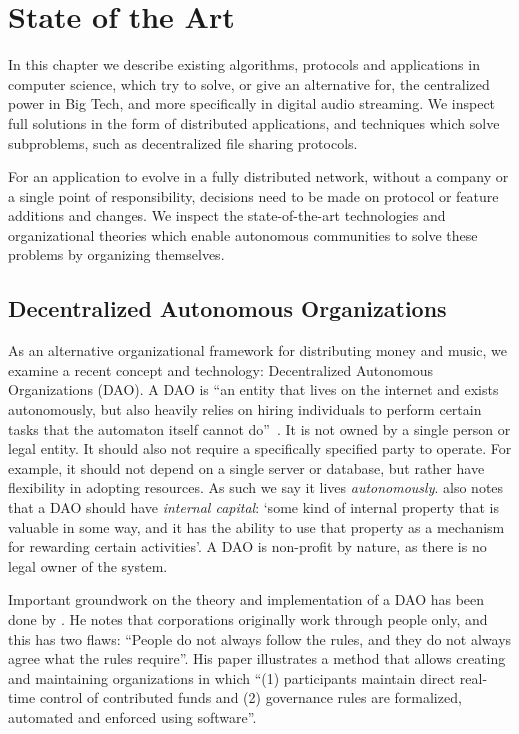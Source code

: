\chapter{\label{chap:state-of-the-art}State of the Art}
In this chapter we describe existing algorithms, protocols and applications in computer science, which try to solve, or give an alternative for, the centralized power in Big Tech, and more specifically in digital audio streaming. We inspect full solutions in the form of distributed applications, and techniques which solve subproblems, such as decentralized file sharing protocols.

For an application to evolve in a fully distributed network, without a company or a single point of responsibility, decisions need to be made on protocol or feature additions and changes. We inspect the state-of-the-art technologies and organizational theories which enable autonomous communities to solve these problems by organizing themselves.

\section{Decentralized Autonomous Organizations}
\label{sec:dao}
As an alternative organizational framework for distributing money and music, we examine a recent concept and technology: Decentralized Autonomous Organizations (DAO).
A DAO is ``an entity that lives on the internet and exists autonomously, but also heavily relies on hiring individuals to perform certain tasks that the automaton itself cannot do''~\citep{buterin2014dao}. It is not owned by a single person or legal entity. It should also not require a specifically specified party to operate. For example, it should not depend on a single server or database, but rather have flexibility in adopting resources. As such we say it lives \textit{autonomously}. \cite{buterin2014dao} also notes that a DAO should have \textit{internal capital}: `some kind of internal property that is valuable in some way, and it has the ability to use that property as a mechanism for rewarding certain activities'. A DAO is non-profit by nature, as there is no legal owner of the system.


Important groundwork on the theory and implementation of a DAO has been done by \cite{jentzsch2016decentralized}. He notes that corporations originally work through people only, and this has two flaws: ``People do not always follow the rules, and they do not always agree what the rules require''. His paper illustrates a method that allows creating and maintaining organizations in which ``(1) participants maintain direct real-time control of contributed funds and (2) governance rules are formalized, automated and enforced using software''.

